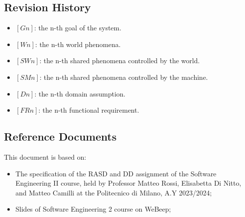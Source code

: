 \documentclass{article}
\begin{document}
\subsection{Revision History}
\begin{itemize}
    \item \textbf{$[Gn]$}: the n-th goal of the system.
    \item \textbf{$[Wn]$}: the n-th world phenomena.
    \item \textbf{$[SWn]$}: the n-th shared phenomena controlled by the world.
    \item \textbf{$[SMn]$}: the n-th shared phenomena controlled by the machine.
    \item \textbf{$[Dn]$}: the n-th domain assumption.
    \item \textbf{$[FRn]$}: the n-th functional requirement.
\end{itemize}


\subsection{Reference Documents}
This document is based on:
\begin{itemize}
    \item The specification of the RASD and DD assignment of the Software Engineering II course, held by Professor Matteo Rossi, Elisabetta Di Nitto, and Matteo Camilli at the Politecnico di Milano, A.Y 2023/2024; 
    \item Slides of Software Engineering 2 course on WeBeep;
\end{itemize}
\end{document}
